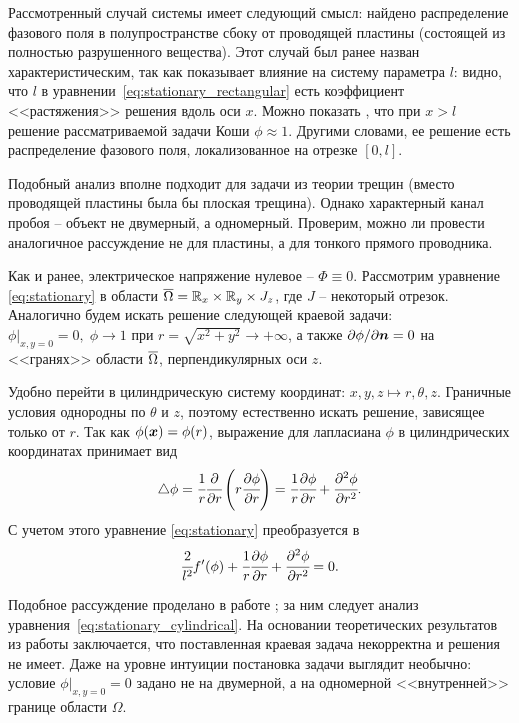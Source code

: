 Рассмотренный случай системы имеет следующий смысл: найдено распределение фазового поля в полупространстве сбоку от проводящей пластины (состоящей из полностью разрушенного вещества). Этот случай был ранее назван характеристическим, так как показывает влияние на систему параметра $l$: видно, что $l$ в уравнении~\eqref{eq:stationary_rectangular} есть коэффициент <<растяжения>> решения вдоль оси $x$. Можно показать \cite{zipunova_higher_codimension}, что при $x > l$ решение рассматриваемой задачи Коши $\phi \approx 1$. Другими словами, ее решение есть распределение фазового поля, локализованное на отрезке $[0, l]$.

Подобный анализ вполне подходит для задачи из теории трещин (вместо проводящей пластины была бы плоская трещина). Однако характерный канал пробоя -- объект не двумерный, а одномерный. Проверим, можно ли провести аналогичное рассуждение не для пластины, а для тонкого прямого проводника.

Как и ранее, электрическое напряжение нулевое -- $\Phi \equiv 0$. Рассмотрим уравнение \eqref{eq:stationary} в области ${\overline{\Omega}} = {\mathbb{R}}_x \times {\mathbb{R}}_y \times J_z$, где $J$ -- некоторый отрезок. Аналогично будем искать решение следующей краевой задачи: $\phi|_{x, y = 0} = 0, \; \phi \to 1$ при $r = \sqrt{x^2 + y^2} \to +\infty$, а также $\partial \phi / \partial {\boldsymbol{n}} = 0$ на <<гранях>> области ${\overline{\Omega}}$, перпендикулярных оси $z$.

Удобно перейти в цилиндрическую систему координат: $x, y, z \mapsto r, \theta, z$. Граничные условия однородны по $\theta$ и $z$, поэтому естественно искать решение, зависящее только от $r$. Так как $\phi({\boldsymbol{x}}) = \phi(r)$, выражение для лапласиана $\phi$ в цилиндрических координатах принимает вид
$$\triangle \phi = \cfrac{1}{r} \cfrac{\partial }{\partial r} \left( r \cfrac{\partial \phi}{\partial r} \right) = \cfrac{1}{r} \cfrac{\partial \phi}{\partial r} + \cfrac{\partial^2 \phi}{\partial {r}^2} {\text{.}}$$
С учетом этого уравнение \eqref{eq:stationary} преобразуется в
\begin{equation}
	\cfrac{2}{l^2} f'(\phi) + \cfrac{1}{r} \cfrac{\partial \phi}{\partial r} + \cfrac{\partial^2 \phi}{\partial {r}^2} = 0 {\text{.}}
	\label{eq:stationary_cylindrical}
\end{equation}

Подобное рассуждение проделано в работе \cite{zipunova_higher_codimension}; за ним следует анализ уравнения~\eqref{eq:stationary_cylindrical}. На основании теоретических результатов из работы \cite{cirstea_elliptic_equations} заключается, что поставленная краевая задача некорректна и решения не имеет. Даже на уровне интуиции постановка задачи выглядит необычно: условие $\phi|_{x, y = 0} = 0$ задано не на двумерной, а на одномерной <<внутренней>> границе области $\Omega$.


